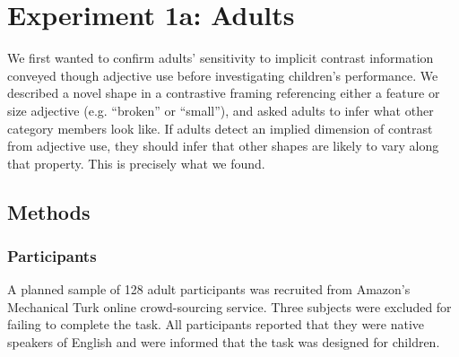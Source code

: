 \documentclass[10pt,letterpaper]{article}
\begin{document}
\section{Experiment 1a: Adults} 

We first wanted to confirm adults' sensitivity to implicit contrast information conveyed though adjective use before investigating children's performance.  We described a novel shape in a contrastive framing referencing either a feature or size adjective (e.g. ``broken'' or ``small''), and asked adults to infer what other category members look like.  If adults detect an implied dimension of contrast from adjective use, they should infer that other shapes are likely to vary along that property.  This is precisely what we found.  





\subsection{Methods}

\subsubsection{Participants}

A planned sample of 128 adult participants was recruited from Amazon's Mechanical Turk online crowd-sourcing service.  Three subjects were excluded for failing to complete the task. All participants reported that they were native speakers of English and were informed that the task was designed for children.  
\end{document}
